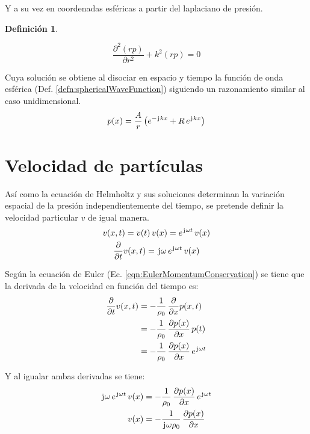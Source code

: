 \documentclass[a5paper,12pt,twoside]{book}
\newtheorem{defn}{{Definición}}[chapter]
\begin{document}
Y a su vez en coordenadas esféricas a partir del laplaciano de presión.

\begin{mdframed}[style=DefinitionFrame]
    \begin{defn}
        \label{defn:HelmholtzSpheric}
    \end{defn}
    \begin{equation*}
        \frac{\partial^2 (rp)}{\partial r^2} + k^2(rp) = 0
    \end{equation*}
\end{mdframed}

Cuya solución se obtiene al disociar en espacio y tiempo la función de onda esférica (Def. \ref{defn:sphericalWaveFunction}) siguiendo un razonamiento similar al caso unidimensional.
\begin{equation*}
    p(x) = \frac{A}{r} \left( e^{-\mkern2mu\mathrm{j}\mkern1mu k x} + R \, e^{\mkern2mu\mathrm{j}\mkern1mu k x} \right)
\end{equation*}


\section{Velocidad de partículas}

Así como la ecuación de Helmholtz y sus soluciones determinan la variación espacial de la presión independientemente del tiempo, se pretende definir la velocidad particular $v$ de igual manera.
\begin{gather*}
    v(x,t) = v(t) \, v(x) = e^{\mkern2mu\mathrm{j}\mkern1mu \omega t} \, v(x)
    \\
    \frac{\partial}{\partial t} v(x,t) = \mkern2mu\mathrm{j}\mkern1mu \omega \, e^{\mkern2mu\mathrm{j}\mkern1mu \omega t} \, v(x)
\end{gather*}

Según la ecuación de Euler (Ec. \ref{eqn:EulerMomentumConservation}) se tiene que la derivada de la velocidad en función del tiempo es:
\begin{align*}
    \frac{\partial}{\partial t} v(x,t) &= - \frac{1}{\rho_0} \, \frac{\partial}{\partial x} p(x,t)
    \\
    &= - \frac{1}{\rho_0} \, \frac{\partial p(x)}{\partial x} \, p(t)
    \\
    &= - \frac{1}{\rho_0} \, \frac{\partial p(x)}{\partial x} \, e^{\mkern2mu\mathrm{j}\mkern1mu \omega t}
\end{align*}

Y al igualar ambas derivadas se tiene:
\begin{align*}
    \mkern2mu\mathrm{j}\mkern1mu \omega \, e^{\mkern2mu\mathrm{j}\mkern1mu \omega t} \, v(x) &= - \frac{1}{\rho_0} \, \frac{\partial p(x)}{\partial x} \, e^{\mkern2mu\mathrm{j}\mkern1mu \omega t}
    \\
    v(x) &= - \frac{1}{\mkern2mu\mathrm{j}\mkern1mu \omega \rho_0} \, \frac{\partial p(x)}{\partial x}
\end{align*}
\end{document}
